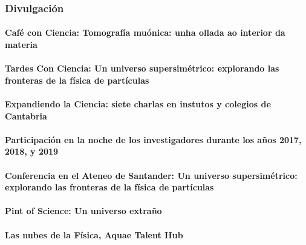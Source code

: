 \documentclass[a4paper, 11pt, twoside, openright]{report}
\begin{document}
\subsubsection{Divulgación}

\paragraph{Café con Ciencia: Tomografía muónica: unha ollada ao interior da materia}


\paragraph{Tardes Con Ciencia: Un universo supersimétrico: explorando las fronteras de la física de partículas}


\paragraph{Expandiendo la Ciencia: siete charlas en instutos y colegios de Cantabria}


\paragraph{Participación en la noche de los investigadores durante los años 2017, 2018, y 2019}


\paragraph{Conferencia en el Ateneo de Santander: Un universo supersimétrico: explorando las fronteras de la física de partículas}


\paragraph{Pint of Science: Un universo extraño}


\paragraph{Las nubes de la Física, Aquae Talent Hub}

\end{document}

